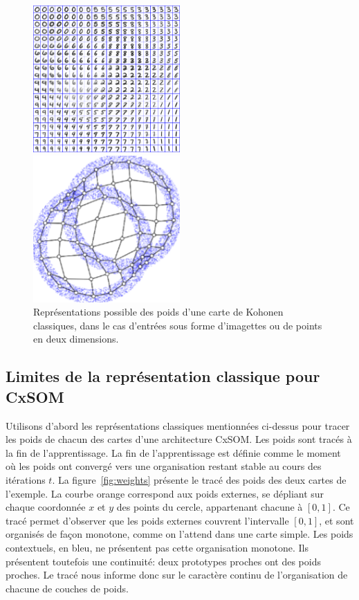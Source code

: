 \begin{figure}
\begin{minipage}{0.5\textwidth}
\centering
\includegraphics[width=0.5\textwidth]{digits.jpg}
\end{minipage}
\begin{minipage}{0.5\textwidth}
\centering
\includegraphics[width=0.5\textwidth]{points.png}
\end{minipage}
\caption{Représentations possible des poids d'une carte de Kohonen classiques, dans le cas d'entrées sous forme d'imagettes ou de points en deux dimensions.\label{fig:representation}}
\end{figure}

\subsection{Limites de la représentation classique pour CxSOM}

Utilisons d'abord les représentations classiques mentionnées ci-dessus pour tracer les poids de chacun des cartes d'une architecture CxSOM. Les poids sont tracés à la fin de l'apprentissage. La fin de l'apprentissage est définie comme le moment où les poids ont convergé vers une organisation restant stable au cours des itérations $t$.
La figure~\ref{fig:weights} présente le tracé des poids des deux cartes de l'exemple.
La courbe orange correspond aux poids externes, se dépliant sur chaque coordonnée $x$ et $y$ des points du cercle, appartenant chacune à $[0,1]$. Ce tracé permet d'observer que les poids externes couvrent l'intervalle $[0,1]$, et sont organisés de façon monotone, comme on l'attend dans une carte simple. Les poids contextuels, en bleu, ne présentent pas cette organisation monotone. Ils présentent toutefois une continuité: deux prototypes proches ont des poids proches. Le tracé nous informe donc sur le caractère continu de l'organisation de chacune de couches de poids. 


